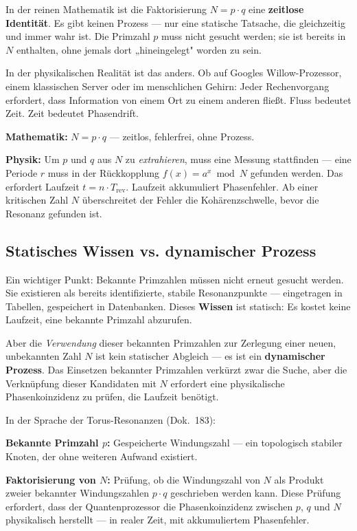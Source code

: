 In der reinen Mathematik ist die Faktorisierung $N = p \cdot q$ eine
\textbf{zeitlose Identität}. Es gibt keinen Prozess — nur eine statische Tatsache,
die gleichzeitig und immer wahr ist. Die Primzahl $p$ muss nicht gesucht werden;
sie ist bereits in $N$ enthalten, ohne jemals dort „hineingelegt" worden zu sein.

In der physikalischen Realität ist das anders. Ob auf Googles Willow-Prozessor,
einem klassischen Server oder im menschlichen Gehirn: Jeder Rechenvorgang erfordert,
dass Information von einem Ort zu einem anderen fließt. Fluss bedeutet Zeit.
Zeit bedeutet Phasendrift.

\begin{keypoint}
\textbf{Mathematik:} $N = p \cdot q$ — zeitlos, fehlerfrei, ohne Prozess.

\textbf{Physik:} Um $p$ und $q$ aus $N$ zu \emph{extrahieren}, muss eine Messung
stattfinden — eine Periode $r$ muss in der Rückkopplung $f(x) = a^x \bmod N$
gefunden werden. Das erfordert Laufzeit $t = n \cdot T_\text{rev}$.
Laufzeit akkumuliert Phasenfehler. Ab einer kritischen Zahl $N$ überschreitet
der Fehler die Kohärenzschwelle, bevor die Resonanz gefunden ist.
\end{keypoint}

\subsection{Statisches Wissen vs. dynamischer Prozess}

Ein wichtiger Punkt: Bekannte Primzahlen müssen nicht erneut gesucht werden.
Sie existieren als bereits identifizierte, stabile Resonanzpunkte — eingetragen
in Tabellen, gespeichert in Datenbanken. Dieses \textbf{Wissen} ist statisch:
Es kostet keine Laufzeit, eine bekannte Primzahl abzurufen.

Aber die \emph{Verwendung} dieser bekannten Primzahlen zur Zerlegung einer neuen,
unbekannten Zahl $N$ ist kein statischer Abgleich — es ist ein \textbf{dynamischer
Prozess}. Das Einsetzen bekannter Primzahlen verkürzt zwar die Suche, aber die
Verknüpfung dieser Kandidaten mit $N$ erfordert eine physikalische Phasenkoinzidenz
zu prüfen, die Laufzeit benötigt.

\begin{technical}
In der Sprache der Torus-Resonanzen (Dok.~183):

\textbf{Bekannte Primzahl $p$:} Gespeicherte Windungszahl — ein topologisch
stabiler Knoten, der ohne weiteren Aufwand existiert.

\textbf{Faktorisierung von $N$:} Prüfung, ob die Windungszahl von $N$ als
Produkt zweier bekannter Windungszahlen $p \cdot q$ geschrieben werden kann.
Diese Prüfung erfordert, dass der Quantenprozessor die Phasenkoinzidenz zwischen
$p$, $q$ und $N$ physikalisch herstellt — in realer Zeit, mit akkumuliertem
Phasenfehler.
\end{technical}


